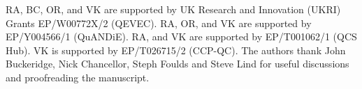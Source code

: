 \documentclass[10pt]{iopart}
\begin{document}
\ack
RA, BC, OR, and VK are supported by UK Research and Innovation (UKRI) Grants EP/W00772X/2 (QEVEC). RA, OR, and VK are supported by EP/Y004566/1 (QuANDiE). RA, and VK are supported by EP/T001062/1 (QCS Hub). VK is supported by EP/T026715/2 (CCP-QC). The authors thank John Buckeridge, Nick Chancellor, Steph Foulds and Steve Lind for useful discussions and proofreading the manuscript.





\end{document}

